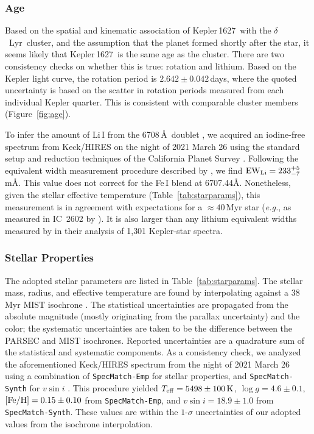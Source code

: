 \documentclass[12pt,modern,twocolumn,tighten]{aastex63}
\newcommand{\cn}{$\delta$\ Lyr\ cluster} %
\newcommand{\sn}{Kepler\,1627} %
\begin{document}
\subsubsection{Age}
Based on the spatial and kinematic association of \sn\ with the \cn,
and the assumption that the planet formed shortly after the star, it
seems likely that \sn\ is the same age as the cluster. There are two
consistency checks on whether this is true: rotation and lithium.
Based on the Kepler light curve, the rotation period is
$2.642\pm0.042$\,days, where the quoted uncertainty is based on the
scatter in rotation periods measured from each individual Kepler
quarter.  This is consistent with comparable cluster members
(Figure~\ref{fig:age}).

To infer the amount of Li\,\textsc{I} from the 6708\,\AA\ doublet
\citep[{\it e.g.},][]{soderblom_ages_2014}, we acquired an iodine-free
spectrum from Keck/HIRES on the night of 2021 March 26 using the
standard setup and reduction techniques of the California Planet
Survey \citep{howard_cps_2010}.  Following the equivalent width
measurement procedure described by \citet{bouma_2021_ngc2516}, we find
${\rm EW}_{\rm Li} = 233^{+5}_{-7}$\,m\AA.   This value does not
correct for the Fe\,\textsc{I} blend at 6707.44\AA.  Nonetheless,
given the stellar effective temperature (Table~\ref{tab:starparams}),
this measurement is in agreement with expectations for a
$\approx40$\,Myr star ({\it e.g.}, as measured in IC~2602 by
\citealt{randich_gaiaeso_2018}).  It is also larger than any lithium
equivalent widths measured by \citet{berger_identifying_2018} in their
analysis of 1{,}301 Kepler-star spectra.


\subsubsection{Stellar Properties}

The adopted stellar parameters are listed in
Table~\ref{tab:starparams}.  The stellar mass, radius, and effective
temperature are found by interpolating against a 38$\,$Myr MIST
isochrone \citep{choi_mesa_2016}.  The statistical uncertainties are
propagated from the absolute magnitude (mostly originating from the
parallax uncertainty) and the color; the systematic uncertainties are
taken to be the difference between the PARSEC
\citep{bressan_parsec_2012} and MIST isochrones.  Reported
uncertainties are a quadrature sum of the statistical and systematic
components.  As a consistency check, we analyzed the aforementioned
Keck/HIRES spectrum from the night of 2021 March 26 using a
combination of \texttt{SpecMatch-Emp} for stellar properties, and
\texttt{SpecMatch-Synth} for $v\sin i$ \citep{yee_SM_2017}.  This
procedure yielded $T_{\rm eff}=5498\pm100\,{\rm K}$, $\log
g=4.6\pm0.1$, $[{\rm Fe/H}]=0.15\pm0.10$ from \texttt{SpecMatch-Emp},
and $v\sin i = 18.9\pm1.0$ from \texttt{SpecMatch-Synth}.  These
values are within the $1$-$\sigma$ uncertainties of our adopted values
from the isochrone interpolation.
\end{document}
